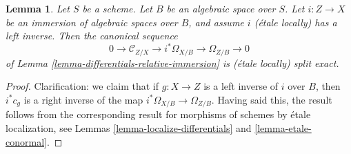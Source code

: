 \documentclass[10pt,a4paper]{amsart}
\theoremstyle{plain}
\newtheorem{lemma}[subsection]{Lemma}
\theoremstyle{definition}
\theoremstyle{remark}
\numberwithin{equation}{subsection}
\begin{document}
\begin{lemma}
\label{lemma-differentials-relative-immersion-section}
Let $S$ be a scheme. Let $B$ be an algebraic space over $S$.
Let $i : Z \to X$ be an immersion of algebraic spaces over $B$, and
assume $i$ (\'etale locally) has a left inverse. Then the canonical
sequence
$$
0 \to \mathcal{C}_{Z/X} \to i^*\Omega_{X/B} \to \Omega_{Z/B} \to 0
$$
of
Lemma \ref{lemma-differentials-relative-immersion}
is (\'etale locally) split exact.
\end{lemma}

\begin{proof}
Clarification: we claim that if $g : X \to Z$ is a left inverse of $i$
over $B$, then $i^*c_g$ is a right inverse of the map
$i^*\Omega_{X/B} \to \Omega_{Z/B}$.
Having said this, the result follows from the corresponding result for
morphisms of schemes by \'etale localization, see
Lemmas \ref{lemma-localize-differentials} and
\ref{lemma-etale-conormal}.
\end{proof}
\end{document}
